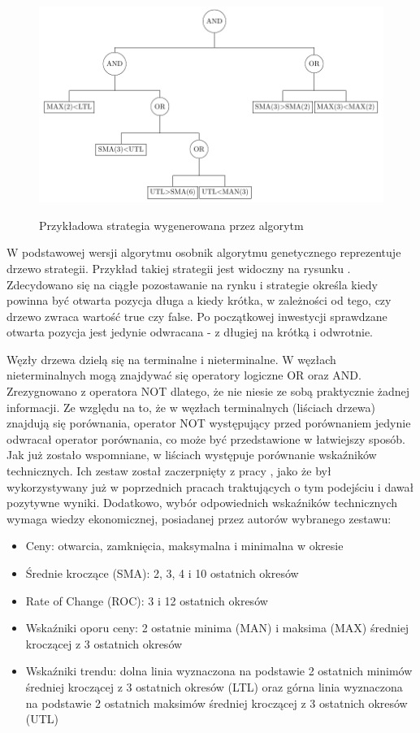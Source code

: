 \documentclass[twoside]{iisthesis}
\begin{document}
\begin{figure}[h]
\center
\caption {Przykładowa strategia wygenerowana przez algorytm}
\includegraphics{drzewo}
\label{fig:drzewo}
\end{figure}

W podstawowej wersji algorytmu osobnik algorytmu genetycznego reprezentuje drzewo strategii. Przykład takiej strategii jest widoczny na rysunku \cite{fig:drzewo}. Zdecydowano się na ciągłe pozostawanie na rynku i strategie określa kiedy powinna być otwarta pozycja długa a kiedy krótka, w zależności od tego, czy drzewo zwraca wartość true czy false. Po początkowej inwestycji sprawdzane otwarta pozycja jest jedynie odwracana - z długiej na krótką i odwrotnie.

Węzły drzewa dzielą się na terminalne i nieterminalne. W węzłach nieterminalnych mogą znajdywać się operatory logiczne OR oraz AND. Zrezygnowano z operatora NOT dlatego, że nie niesie ze sobą praktycznie żadnej informacji. Ze względu na to, że w węzłach terminalnych (liściach drzewa) znajdują się porównania, operator NOT występujący przed porównaniem jedynie odwracał operator porównania, co może być przedstawione w łatwiejszy sposób.
Jak już zostało wspomniane, w liściach występuje porównanie wskaźników technicznych. Ich zestaw został zaczerpnięty z pracy \cite{5393324}, jako że był wykorzystywany już w poprzednich pracach traktujących o tym podejściu i dawał pozytywne wyniki. Dodatkowo, wybór odpowiednich wskaźników technicznych wymaga wiedzy ekonomicznej, posiadanej przez autorów wybranego zestawu:

\begin{itemize}
	\item Ceny: otwarcia, zamknięcia, maksymalna i minimalna w okresie
	\item Średnie kroczące (SMA): 2, 3, 4 i 10 ostatnich okresów
	\item Rate of Change (ROC): 3 i 12 ostatnich okresów
	\item Wskaźniki oporu ceny: 2 ostatnie minima (MAN) i maksima (MAX) średniej kroczącej z 3 ostatnich okresów
	\item Wskaźniki trendu: dolna linia wyznaczona na podstawie 2 ostatnich minimów średniej kroczącej z 3 ostatnich okresów (LTL) oraz górna linia wyznaczona na podstawie 2 ostatnich maksimów średniej kroczącej z 3 ostatnich okresów (UTL)
\end{itemize}
\end{document}
